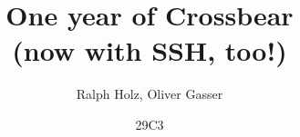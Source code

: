 \documentclass[t]{beamer}
\title[One year of Crossbear]{One year of Crossbear \\ (now with SSH, too!)}
\author[Ralph Holz, Oliver Gasser]{Ralph Holz, Oliver Gasser}
\institute{Network Architectures and Services \\ Technische Universität München}
\date{29C3}
\begin{document}
\begin{frame}
  \titlepage
\end{frame}










%
\end{document}
